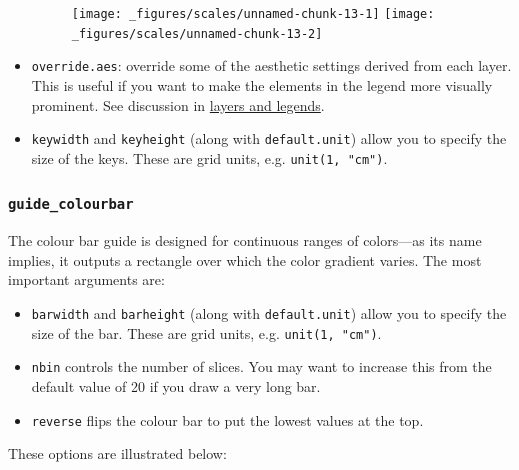\begin{itemize}
  \begin{figure}[H]
    \texttt{[image: \_figures/scales/unnamed-chunk-13-1]}%
    \texttt{[image: \_figures/scales/unnamed-chunk-13-2]}
  \end{figure}
\item
  \texttt{override.aes}: override some of the aesthetic settings derived
  from each layer. This is useful if you want to make the elements in
  the legend more visually prominent. See discussion in
  \hyperref[sub-layers-legends]{layers and legends}.
\item
  \texttt{keywidth} and \texttt{keyheight} (along with
  \texttt{default.unit}) allow you to specify the size of the keys.
  These are grid units, e.g. \texttt{unit(1, "cm")}.
\end{itemize}

\subsubsection{\texttt{guide\_colourbar}}

The colour bar guide is designed for continuous ranges of colors---as
its name implies, it outputs a rectangle over which the color gradient
varies. The most important arguments are: 

\begin{itemize}
\item
  \texttt{barwidth} and \texttt{barheight} (along with
  \texttt{default.unit}) allow you to specify the size of the bar. These
  are grid units, e.g. \texttt{unit(1, "cm")}.
\item
  \texttt{nbin} controls the number of slices. You may want to increase
  this from the default value of 20 if you draw a very long bar.
\item
  \texttt{reverse} flips the colour bar to put the lowest values at the
  top.
\end{itemize}

These options are illustrated below:

\begin{Shaded}
\begin{Highlighting}[]
\StringTok{ }\NormalTok{(} \NormalTok{, } \NormalTok{:}\NormalTok{, } \NormalTok{:}\NormalTok{)}
\StringTok{ }\StringTok{ }\NormalTok{(}\NormalTok{(} 

\StringTok{ }\NormalTok{(} \NormalTok{(} \NormalTok{))}
\StringTok{ }\NormalTok{(} \NormalTok{(} \NormalTok{(}\NormalTok{, }\NormalTok{)))}
\end{Highlighting}
\end{Shaded}

